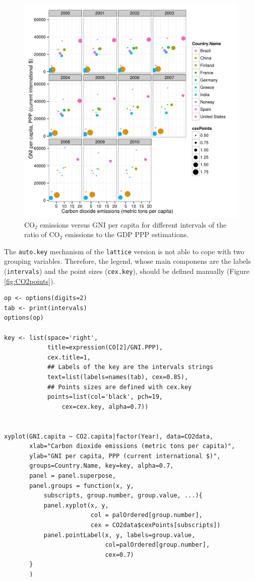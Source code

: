 \begin{figure}[htbp]
\centering
\includegraphics[width=.9\linewidth]{figs/CO2pointsGG.pdf}
\caption{\(\mathrm{CO_2}\) emissions versus GNI per capita for different intervals of the ratio of \(\mathrm{CO_2}\) emissions to the GDP PPP estimations. \label{fig:CO2pointsGG}}
\end{figure}

The \texttt{auto.key} mechanism of the \texttt{lattice} version is not able to cope with two grouping variables. Therefore, the legend, whose main componens are the labels (\texttt{intervals}) and the point sizes (\texttt{cex.key}), should be defined manually (Figure \ref{fig:CO2points}). 


\lstset{language=r,label= ,caption= ,captionpos=b,numbers=none}
\begin{lstlisting}
op <- options(digits=2)
tab <- print(intervals)
options(op)
  
key <- list(space='right',
            title=expression(CO[2]/GNI.PPP),
            cex.title=1,
            ## Labels of the key are the intervals strings
            text=list(labels=names(tab), cex=0.85),
            ## Points sizes are defined with cex.key
            points=list(col='black', pch=19,
                cex=cex.key, alpha=0.7))

  
xyplot(GNI.capita ~ CO2.capita|factor(Year), data=CO2data,
       xlab="Carbon dioxide emissions (metric tons per capita)",
       ylab="GNI per capita, PPP (current international $)",
       groups=Country.Name, key=key, alpha=0.7,
       panel = panel.superpose,
       panel.groups = function(x, y,
           subscripts, group.number, group.value, ...){
           panel.xyplot(x, y,
                        col = palOrdered[group.number],
                        cex = CO2data$cexPoints[subscripts])
           panel.pointLabel(x, y, labels=group.value,
                            col=palOrdered[group.number],
                            cex=0.7)
       }
       ) 
\end{lstlisting}


